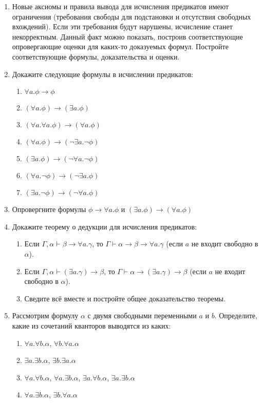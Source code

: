 \documentclass[10pt,a4paper,oneside]{article}
\begin{document}
\begin{enumerate}
\item Новые аксиомы и правила вывода для исчисления предикатов имеют ограничения
(требования свободы для подстановки и отсутствия свободных вхождений). 
Если эти требования будут нарушены, исчисление станет некорректным.
Данный факт можно показать, построив соответствующие опровергающие
оценки для каких-то доказуемых формул. Постройте соответствующие формулы,
доказательства и оценки.

\item Докажите следующие формулы в исчислении предикатов:
\begin{enumerate}
\item $\forall a.\phi\rightarrow \phi$
\item $(\forall a.\phi)\rightarrow (\exists a.\phi)$
\item $(\forall a.\forall a.\phi) \rightarrow (\forall a.\phi)$
\item $(\forall a.\phi) \rightarrow (\neg \exists a.\neg \phi)$ 
\item $(\exists a.\phi) \rightarrow (\neg \forall a.\neg \phi)$
\item $(\forall a.\neg\phi) \rightarrow (\neg \exists a.\phi)$ 
\item $(\exists a.\neg\phi) \rightarrow (\neg \forall a.\phi)$
\end{enumerate}

\item Опровергните формулы $\phi\rightarrow\forall a. \phi$ и $(\exists a.\phi)\rightarrow (\forall a.\phi)$

\item Докажите теорему о дедукции для исчисления предикатов:
\begin{enumerate}
\item Если $\Gamma, \alpha \vdash \beta\rightarrow\forall a.\gamma$, то
$\Gamma\vdash\alpha\rightarrow\beta\rightarrow\forall a.\gamma$ (если $a$ не входит
свободно в $\alpha$).
\item Если $\Gamma, \alpha \vdash (\exists a.\gamma)\rightarrow\beta$, то
$\Gamma\vdash\alpha\rightarrow(\exists a.\gamma)\rightarrow\beta$ (если $a$ не входит
свободно в $\alpha$).
\item Сведите всё вместе и постройте общее доказательство теоремы.
\end{enumerate}

\item Рассмотрим формулу $\alpha$ с двумя свободными переменными $a$ и $b$.
Определите, какие из сочетаний кванторов выводятся из каких:
\begin{enumerate}
\item $\forall a.\forall b.\alpha$, $\forall b.\forall a.\alpha$
\item $\exists a.\exists b.\alpha$, $\exists b.\exists a.\alpha$
\item $\forall a.\forall b.\alpha$, $\forall a.\exists b.\alpha$, $\exists a.\forall b.\alpha$, $\exists a.\exists b.\alpha$
\item $\forall a.\exists b.\alpha$, $\exists b.\forall a.\alpha$
\end{enumerate}

\end{enumerate}
\end{document}
